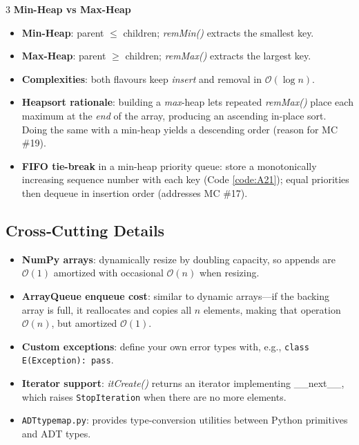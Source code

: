 \documentclass[6pt,landscape]{article}
\newcommand{\bigO}[1]{\ensuremath{\mathcal{O}(#1)}}
\newcommand{\keyword}[1]{\textbf{\textcolor{keywordcolor}{#1}}}
\newcommand{\op}[1]{\textit{\textcolor{opcolor}{#1}}}
\begin{document}
\begin{multicols}{3}
\textbf{Min-Heap vs Max-Heap}\label{sec:minvsmax}
\begin{itemize}
  \item \keyword{Min-Heap}: parent \(\le\) children; \op{remMin()} extracts the
  smallest key.
  \item \keyword{Max-Heap}: parent \(\ge\) children; \op{remMax()} extracts the
  largest key.
  \item \textbf{Complexities}: both flavours keep \op{insert} and removal in
  \bigO{\log n}.
  \item \textbf{Heapsort rationale}: building a \emph{max}-heap lets repeated
  \op{remMax()} place each maximum at the \emph{end} of the array, producing an
  ascending in-place sort.  
  Doing the same with a min-heap yields a descending order (reason for MC \#19).
  \item \keyword{FIFO tie-break} in a min-heap priority queue: store a
  monotonically increasing sequence number with each key
  (Code \ref{code:A21}); equal priorities then dequeue in insertion order
  (addresses MC \#17).
\end{itemize}


\subsection{Cross‐Cutting Details}\label{sec:crosscut}
\begin{itemize}
  \item \keyword{NumPy arrays}: dynamically resize by doubling capacity, so appends are \bigO{1} amortized with occasional \bigO{n} when resizing.
  \item \keyword{ArrayQueue enqueue cost}: similar to dynamic arrays—if the backing array is full, it reallocates and copies all \(n\) elements, making that operation \bigO{n}, but amortized \bigO{1}.
  \item \keyword{Custom exceptions}: define your own error types with, e.g., \texttt{class E(Exception): pass}.
  \item \keyword{Iterator support}: \op{itCreate()} returns an iterator implementing \_\_next\_\_, which raises \texttt{StopIteration} when there are no more elements.
  \item \texttt{ADTtypemap.py}: provides type‐conversion utilities between Python primitives and ADT types.
\end{itemize}


\end{multicols}
\end{document}
